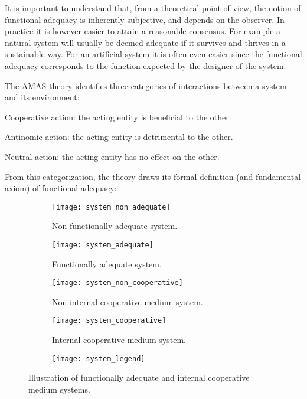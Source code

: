 It is important to understand that, from a theoretical point of view, the notion of functional adequacy is inherently subjective, and depends on the observer. In practice it is however easier to attain a reasonable consensus. For example a natural system will usually be deemed adequate if it survives and thrives in a sustainable way. For an artificial system it is often even easier since the functional adequacy corresponds to the function expected by the designer of the system.

The AMAS theory identifies three categories of interactions between a system and its environment:
\begin{compactitem}
\item Cooperative action: the acting entity is beneficial to the other.
\item Antinomic action: the acting entity is detrimental to the other.
\item Neutral action: the acting entity has no effect on the other.
\end{compactitem}

From this categorization, the theory draws its formal definition (and fundamental axiom) of functional adequacy:


\begin{figure}
\centering

	\begin{subfigure}[b]{0.45\textwidth}
		\centering
		\texttt{[image: system\_non\_adequate]}
		\caption{Non functionally adequate system.}\label{adequacy_comp_1}
	\end{subfigure}
	\begin{subfigure}[b]{0.45\textwidth}
		\centering
		\texttt{[image: system\_adequate]}
		\caption{Functionally adequate system.}\label{adequacy_comp_2}
	\end{subfigure}
	
	\begin{subfigure}[b]{0.45\textwidth}
		\centering
		\texttt{[image: system\_non\_cooperative]}
		\caption{Non internal cooperative medium system.}\label{internal_cooperative_comp_1}
	\end{subfigure}
	\begin{subfigure}[b]{0.45\textwidth}
		\centering
		\texttt{[image: system\_cooperative]}
		\caption{Internal cooperative medium system.}\label{internal_cooperative_comp_2}
	\end{subfigure}
	
	\begin{subfigure}[b]{0.7\textwidth}
		\centering
		\texttt{[image: system\_legend]}
	\end{subfigure}
	
\caption{Illustration of functionally adequate and internal cooperative medium systems.}
\label{adequacy_comp}
\end{figure}

